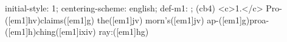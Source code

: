 initial-style: 1;
centering-scheme: english;
def-m1: \grealign;
(cb4) <c>1.</c> Pro-([em1]hv)claims([em1]g) the([em1]jv) morn's([em1]jv) ap-([em1]g)proa-([em1]h)ching([em1]ixiv) ray:([em1]hg)
